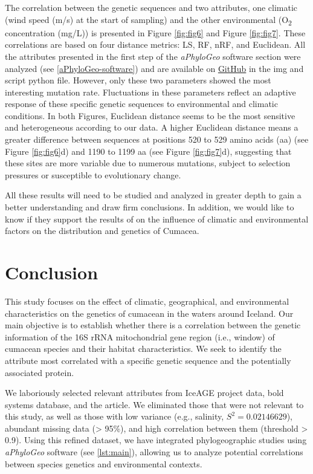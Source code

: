 The correlation between the genetic sequences and two attributes, one climatic (wind speed (m/s) at the start of sampling) and the other environmental (O\textsubscript{2} concentration (mg/L)) is presented in Figure \ref{fig:fig6} and Figure \ref{fig:fig7}. These correlations are based on four distance metrics: LS, RF, nRF, and Euclidean. All the attributes presented in the first step of the \textit{aPhyloGeo} software section were analyzed (see \autoref{aPhyloGeo-software}) and are available on \href{https://github.com/tahiri-lab/Cumacea_aPhyloGeo}{GitHub} in the img and script python file. However, only these two parameters showed the most interesting mutation rate. Fluctuations in these parameters reflect an adaptive response of these specific genetic sequences to environmental and climatic conditions. In both Figures, Euclidean distance seems to be the most sensitive and heterogeneous according to our data. A higher Euclidean distance means a greater difference between sequences at positions 520 to 529 amino acids (aa) (see Figure \ref{fig:fig6}d) and 1190 to 1199 aa (see Figure \ref{fig:fig7}d), suggesting that these sites are more variable due to numerous mutations, subject to selection pressures or susceptible to evolutionary change. 

All these results will need to be studied and analyzed in greater depth to gain a better understanding and draw firm conclusions. In addition, we would like to know if they support the results of \citep{uhlir_adding_2021} on the influence of climatic and environmental factors on the distribution and genetics of Cumacea.

\section{Conclusion}\label{conclusion}
This study focuses on the effect of climatic, geographical, and environmental characteristics on the genetics of cumacean in the waters around Iceland. Our main objective is to establish whether there is a  correlation between the genetic information of the 16S rRNA mitochondrial gene region (i.e., window) of cumacean species and their habitat characteristics. We seek to identify the attribute most correlated with a specific genetic sequence and the potentially associated protein.

We laboriously selected relevant attributes from IceAGE project data, bold systems database, and the \citep{uhlir_adding_2021} article. We eliminated those that were not relevant to this study, as well as those with low variance (e.g., salinity, $S^2 = 0.02146629$), abundant missing data (> 95\%), and high correlation between them (threshold > 0.9). Using this refined dataset, we have integrated phylogeographic studies using \textit{aPhyloGeo} software (see \autoref{lst:main}), allowing us to analyze potential correlations between species genetics and environmental contexts.

